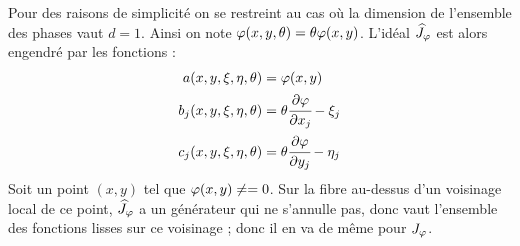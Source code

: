 \begin{preuve}
	Pour des raisons de simplicité on se restreint au cas où la dimension de l'ensemble des phases vaut $d=1$. Ainsi on note $\varphi(x,y,\theta)=\theta \varphi(x,y)$. L'idéal $\widehat{J}_{\varphi}$ est alors engendré par les fonctions :
	\begin{align*}
	a(x,y,\xi,\eta,\theta)&=\varphi(x,y)\\
	b_j(x,y,\xi,\eta,\theta) &= \theta\cfrac{\partial \varphi}{\partial x_j}-\xi_j\\
	c_j(x,y,\xi,\eta,\theta) &= \theta\cfrac{\partial \varphi}{\partial y_j}-\eta_j
	\end{align*}
	Soit un point $(x,y)$ tel que $\varphi(x,y)\neq=0$. Sur la fibre au-dessus d'un voisinage local de ce point, $\widehat{J}_{\varphi}$ a un générateur qui ne s'annulle pas, donc vaut l'ensemble des fonctions lisses sur ce voisinage ; donc il en va de même pour $J_{\varphi}$.
	

\end{preuve}
